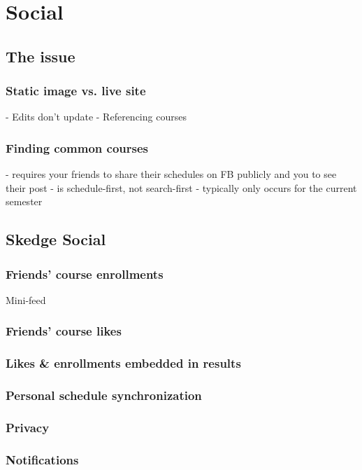 \section{Social}

\subsection{The issue}

  \subsubsection{Static image vs. live site}

  - Edits don’t update
  - Referencing courses

  \subsubsection{Finding common courses}

  - requires your friends to share their schedules on FB publicly and you to see their post
  - is schedule-first, not search-first
  - typically only occurs for the current semester


\subsection{Skedge Social}


  \subsubsection{Friends' course enrollments}

  Mini-feed

  \subsubsection{Friends' course likes}

  \subsubsection{Likes \& enrollments embedded in results}

  \subsubsection{Personal schedule synchronization}

  \subsubsection{Privacy}

  \subsubsection{Notifications}

